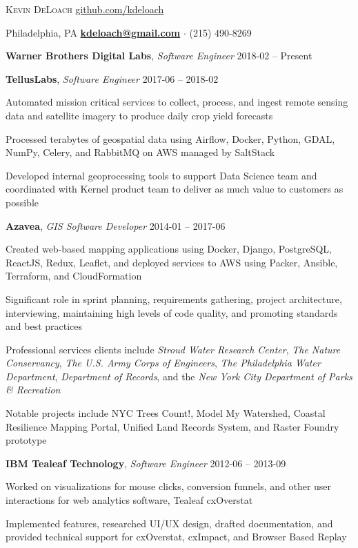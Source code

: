 \documentclass[12pt,a4paper]{article}
\newcommand{\sectionhead}{\normalfont\normalsize\scshape}
\newcommand{\workhead}[3]{\textbf{#1}, \emph{#2} \hfill #3}
\newcommand{\li}{\item[--]}
\begin{document}
\noindent
{\huge \textsc{Kevin DeLoach}}
\hfill
\href{https://github.com/kdeloach}{github.com/kdeloach}

\noindent
{\sc Philadelphia, PA}
\hfill
\href{mailto:kdeloach@gmail.com}{\bfseries kdeloach@gmail.com}
$\cdot$
(215) 490-8269

\begin{description}[leftmargin=0em]
    \itemsep0pt
    \parskip3pt
    \item
        \workhead{Warner Brothers Digital Labs}{Software Engineer}{2018-02 -- Present}
	\item
		\workhead{TellusLabs}{Software Engineer}{2017-06 -- 2018-02}
        \begin{itemize*}
        	\li Automated mission critical services to collect, process, and ingest remote sensing data and satellite imagery to produce daily crop yield forecasts
            \li Processed terabytes of geospatial data using Airflow, Docker, Python, GDAL, NumPy, \mbox{Celery}, and RabbitMQ on AWS managed by SaltStack
            \li Developed internal geoprocessing tools to support Data Science team and coordinated with Kernel product team to deliver as much value to customers as possible
        \end{itemize*}
    \item
        \workhead{Azavea}{GIS Software Developer}{2014-01 -- 2017-06}
        \begin{itemize*}
            \li Created web-based mapping applications using Docker, Django, PostgreSQL, \mbox{ReactJS}, Redux, Leaflet, and deployed services to AWS using Packer, Ansible, Terraform, and CloudFormation
            \li Significant role in sprint planning, requirements gathering, project architecture, interviewing, maintaining high levels of code quality, and promoting standards and best practices
            \li Professional services clients include \emph{Stroud Water Research Center}, \emph{The Nature Conservancy}, \emph{The U.S. Army Corps of Engineers}, \emph{The Philadelphia Water Department}, \emph{Department of Records}, and the \emph{New York City Department of Parks \& Recreation}
            \li Notable projects include NYC Trees Count!, Model My Watershed, Coastal Resilience Mapping Portal, Unified Land Records System, and Raster Foundry prototype
        \end{itemize*}
    \item
        \workhead{IBM Tealeaf Technology}{Software Engineer}{2012-06 -- 2013-09}
        \begin{itemize*}
            \li Worked on visualizations for mouse clicks, conversion funnels, and other user interactions for web analytics software, Tealeaf cxOverstat
            \li Implemented features, researched UI/UX design, drafted documentation, and provided technical support for cxOverstat, cxImpact, and Browser Based Replay
        \end{itemize*}


\end{description}
\end{document}
